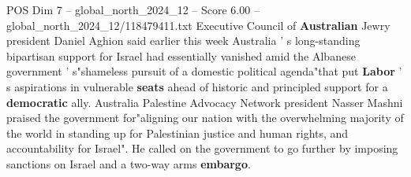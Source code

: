 \begin{textsample}{POS Dim 7 – global\_north\_2024\_12 – Score 6.00 – global\_north\_2024\_12/118479411.txt}
Executive Council of \textbf{Australian} Jewry president Daniel Aghion said earlier this week Australia ' s long-standing bipartisan support for Israel had essentially vanished amid the Albanese government ' s"shameless pursuit of a domestic political agenda"that put \textbf{Labor} ' s aspirations in vulnerable \textbf{seats} ahead of historic and principled support for a \textbf{democratic} ally.
Australia Palestine Advocacy Network president Nasser Mashni praised the government for"aligning our nation with the overwhelming majority of the world in standing up for Palestinian justice and human rights, and accountability for Israel".
He called on the government to go further by imposing sanctions on Israel and a two-way arms \textbf{embargo}.

\end{textsample}
